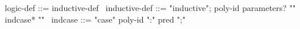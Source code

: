 \begin{syntax}
  logic-def ::= inductive-def
  \
  inductive-def ::= "inductive";
  poly-id parameters? "{" indcase* "}"
  \
  indcase ::= "case" poly-id ":" pred ";"
\end{syntax}